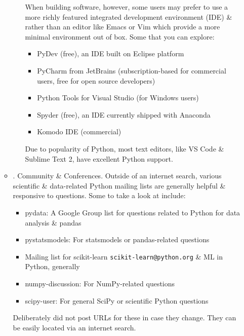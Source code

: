 \documentclass{article}
\begin{document}
\begin{itemize}
\begin{itemize}
\begin{itemize}
			When building software, however, some users may prefer to use a more richly featured integrated development environment (IDE) \& rather than an editor like Emacs or Vim which provide a more minimal environment out of box. Some that you can explore:
			\begin{itemize}
				\item PyDev (free), an IDE built on Eclipse platform
				\item PyCharm from JetBrains (subscription-based for commercial users, free for open source developers)
				\item Python Tools for Visual Studio (for Windows users)
				\item Spyder (free), an IDE currently shipped with Anaconda
				\item Komodo IDE (commercial)
			\end{itemize}
			Due to popularity of Python, most text editors, like VS Code \& Sublime Text 2, have excellent Python support.
		\end{itemize}
		\item {. Community \& Conferences.} Outside of an internet search, various scientific \& data-related Python mailing lists are generally helpful \& responsive to questions. Some to take a look at include:
		\begin{itemize}
			\item pydata: A Google Group list for questions related to Python for data analysis \& pandas
			\item pystatsmodels: For statsmodels or pandas-related questions
			\item Mailing list for scikit-learn \verb|scikit-learn@python.org| \& ML in Python, generally
			\item numpy-discussion: For NumPy-related questions
			\item scipy-user: For general SciPy or scientific Python questions
		\end{itemize}
		Deliberately did not post URLs for these in case they change. They can be easily located via an internet search.
		

\end{itemize}
\end{itemize}
\end{document}
